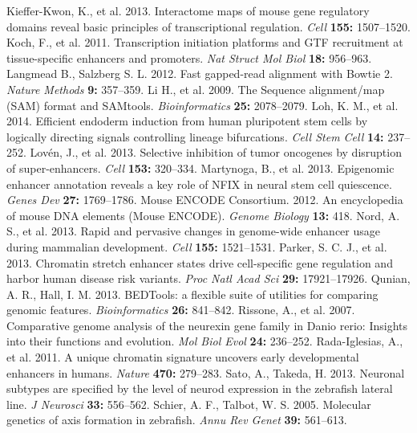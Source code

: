 \begin{thebibliography}{40}
	 Kieffer-Kwon, K., et al. 2013. Interactome maps of mouse gene regulatory domains reveal basic principles of transcriptional regulation. \emph{Cell} \textbf{155:} 1507--1520.
	 Koch, F., et al. 2011. Transcription initiation platforms and GTF recruitment at tissue-specific enhancers and promoters. \emph{Nat Struct Mol Biol} \textbf{18:} 956--963.
	 Langmead B., Salzberg S. L. 2012. Fast gapped-read alignment with Bowtie 2. \emph{Nature Methods} \textbf{9:} 357--359.
	 Li H., et al. 2009. The Sequence alignment/map (SAM) format and SAMtools. \emph{Bioinformatics} \textbf{25:} 2078--2079.
	 Loh, K. M., et al. 2014. Efficient endoderm induction from human pluripotent stem cells by logically directing signals controlling lineage bifurcations. \emph{Cell Stem Cell} \textbf{14:} 237--252.
	 Lov\'en, J., et al. 2013. Selective inhibition of tumor oncogenes by disruption of super-enhancers. \emph{Cell} \textbf{153:} 320--334.
	 Martynoga, B., et al. 2013. Epigenomic enhancer annotation reveals a key role of NFIX in neural stem cell quiescence. \emph{Genes Dev} \textbf{27:} 1769--1786.
	 Mouse ENCODE Consortium. 2012. An encyclopedia of mouse DNA elements (Mouse ENCODE). \emph{Genome Biology} \textbf{13:} 418.
	 Nord, A. S., et al. 2013. Rapid and pervasive changes in genome-wide enhancer usage during mammalian development. \emph{Cell} \textbf{155:} 1521--1531.
	 Parker, S. C. J., et al. 2013. Chromatin stretch enhancer states drive cell-specific gene regulation and harbor human disease risk variants. \emph{Proc Natl Acad Sci} \textbf{29:} 17921--17926.
	 Qunian, A. R., Hall, I. M. 2013. BEDTools: a flexible suite of utilities for comparing genomic features. \emph{Bioinformatics} \textbf{26:} 841--842.
	 Rissone, A., et al. 2007. Comparative genome analysis of the neurexin gene family in Danio rerio: Insights into their functions and evolution. \emph{Mol Biol Evol} \textbf{24:} 236--252.
	 Rada-Iglesias, A., et al. 2011. A unique chromatin signature uncovers early developmental enhancers in humans. \emph{Nature} \textbf{470:} 279--283.
	 Sato, A., Takeda, H. 2013. Neuronal subtypes are specified by the level of neurod expression in the zebrafish lateral line. \emph{J Neurosci} \textbf{33:} 556--562.
	 Schier, A. F., Talbot, W. S. 2005. Molecular genetics of axis formation in zebrafish. \emph{Annu Rev Genet} \textbf{39:} 561--613.

\end{thebibliography}
